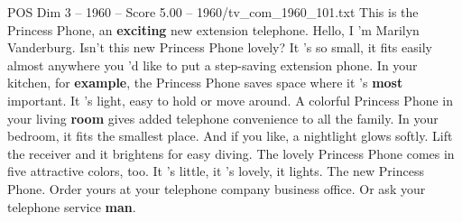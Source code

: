 \begin{textsample}{POS Dim 3 – 1960 – Score 5.00 – 1960/tv\_com\_1960\_101.txt}  \label{ex:f3_pos_022}
This is the Princess Phone, an \textbf{exciting} new extension telephone.
Hello, I 'm Marilyn Vanderburg.
Isn't this new Princess Phone lovely?
It 's so small, it fits easily almost anywhere you 'd like to put a step-saving extension phone.
In your kitchen, for \textbf{example}, the Princess Phone saves space where it 's \textbf{most} important.
It 's light, easy to hold or move around.
A colorful Princess Phone in your living \textbf{room} gives added telephone convenience to all the family.
In your bedroom, it fits the smallest place.
And if you like, a nightlight glows softly.
Lift the receiver and it brightens for easy diving.
The lovely Princess Phone comes in five attractive colors, too.
It 's little, it 's lovely, it lights.
The new Princess Phone.
Order yours at your telephone company business office.
Or ask your telephone service \textbf{man}.

\end{textsample}
